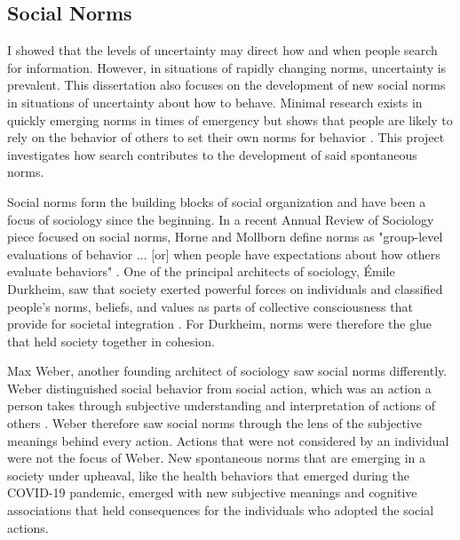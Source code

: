 \subsection{Social Norms}
I showed that the levels of uncertainty may direct how and when people
search for information. However, in situations of rapidly changing norms,
uncertainty is prevalent. This dissertation also focuses on the development of
new social norms in situations of uncertainty about how to behave. 
Minimal research exists in quickly emerging
norms in times of emergency but shows that people are likely to rely on the
behavior of others to set their own norms for behavior \citep{alvarez2018,
horneNormsIntegratedFramework2020}. This project investigates how search
contributes to the development of said spontaneous norms.

Social norms form the building blocks of social organization and have been a
focus of sociology since the beginning. In a recent Annual Review of Sociology
piece focused on social norms, Horne and Mollborn define norms as "group-level
evaluations of behavior ... [or] when people have expectations about how others
evaluate behaviors" \citeyearpar[p. 468-69]{horneNormsIntegratedFramework2020}.
One of the principal architects of sociology, \'{E}mile Durkheim, saw that
society exerted powerful forces on individuals and classified people's norms,
beliefs, and values as parts of collective consciousness that provide for
societal integration \citeyearpar{durkheimSuicide1897, durkheimDivisionLaborSociety1933}.
For Durkheim, norms were therefore the glue that held society together in cohesion.

Max Weber, another founding architect of sociology saw social norms differently.
Weber distinguished social behavior from social action, which was an action a
person takes through subjective understanding and interpretation of actions of
others \citeyearpar{weber1978economy}. Weber therefore saw social norms through
the lens of the subjective meanings behind every action. Actions that were not
considered by an individual were not the focus of Weber. New spontaneous norms
that are emerging in a society under upheaval, like the health behaviors that
emerged during the COVID-19 pandemic, emerged with new subjective meanings and
cognitive associations that held consequences for the individuals who adopted
the social actions.

